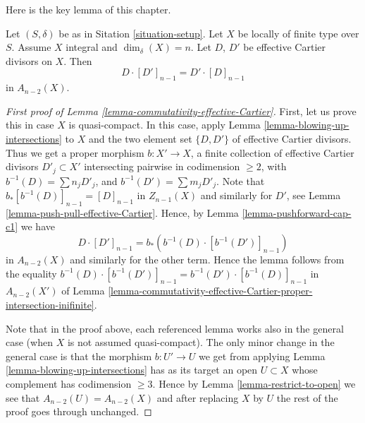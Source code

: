 \noindent
Here is the key lemma of this chapter.

\begin{lemma}
\label{lemma-commutativity-effective-Cartier}
Let $(S, \delta)$ be as in Sitation \ref{situation-setup}.
Let $X$ be locally of finite type over $S$.
Assume $X$ integral and $\dim_\delta(X) = n$.
Let $D$, $D'$ be effective Cartier divisors on $X$.
Then
$$
D \cdot [D']_{n - 1} = D' \cdot [D]_{n - 1}
$$
in $A_{n - 2}(X)$.
\end{lemma}

\begin{proof}[First proof of Lemma \ref{lemma-commutativity-effective-Cartier}]
First, let us prove this in case $X$ is quasi-compact.
In this case, apply Lemma \ref{lemma-blowing-up-intersections} to $X$ and the
two element set $\{D, D'\}$ of effective Cartier divisors.
Thus we get a proper morphism $b : X' \to X$,
a finite collection of effective Cartier
divisors $D'_j \subset X'$ intersecting pairwise in codimension $\geq 2$,
with $b^{-1}(D) = \sum n_j D'_j$, and $b^{-1}(D') = \sum m_j D'_j$.
Note that $b_*[b^{-1}(D)]_{n - 1} = [D]_{n - 1}$ in $Z_{n - 1}(X)$
and similarly for $D'$,
see Lemma \ref{lemma-push-pull-effective-Cartier}.
Hence, by Lemma \ref{lemma-pushforward-cap-c1} we have
$$
D \cdot [D']_{n - 1} = b_*\left(b^{-1}(D) \cdot [b^{-1}(D')]_{n - 1}\right)
$$
in $A_{n - 2}(X)$ and similarly for the other term. Hence the
lemma follows from the equality
$b^{-1}(D) \cdot [b^{-1}(D')]_{n - 1} = b^{-1}(D') \cdot [b^{-1}(D)]_{n - 1}$
in $A_{n - 2}(X')$ of Lemma
\ref{lemma-commutativity-effective-Cartier-proper-intersection-inifinite}.

\medskip\noindent
Note that in the proof above, each referenced lemma works also
in the general case (when $X$ is not assumed quasi-compact). The
only minor change in the general case is that the morphism
$b : U' \to U$ we get from applying Lemma \ref{lemma-blowing-up-intersections}
has as its target
an open $U \subset X$ whose complement has codimension $\geq 3$.
Hence by Lemma \ref{lemma-restrict-to-open} we see that
$A_{n - 2}(U) = A_{n - 2}(X)$
and after replacing $X$ by $U$ the rest of the proof goes through
unchanged.
\end{proof}

